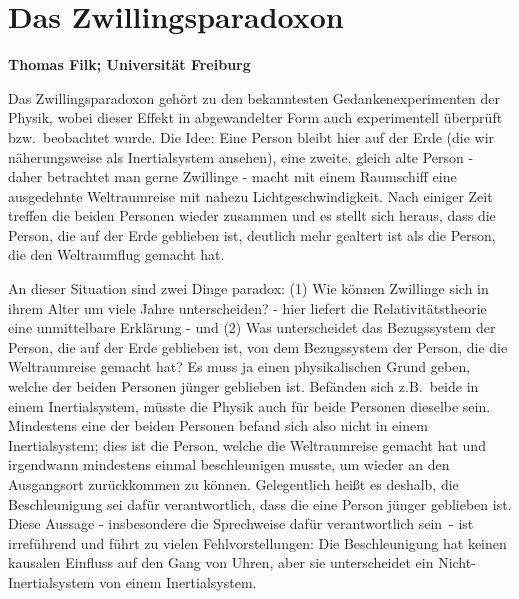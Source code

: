 
\setcounter{page}{1}
\setcounter{section}{0}
\setcounter{figure}{0}
\setcounter{equation}{0}
\setcounter{table}{0}
\setcounter{footnote}{0}

\section*{Das Zwillingsparadoxon}
\noindent
{\bf Thomas Filk; Universit\"at Freiburg}
\vspace{1cm}

\label{chap_Zwilling}

\noindent
Das Zwillingsparadoxon geh\"ort zu den bekanntesten Gedankenexperimenten der Physik,
wobei dieser Effekt in abgewandelter Form auch
experimentell \"uberpr\"uft bzw.\ beobachtet wurde. 
Die Idee: Eine Person bleibt hier auf der Erde (die wir n\"aherungsweise als Inertialsystem
ansehen), eine zweite, gleich alte Person - daher betrachtet man gerne Zwillinge - macht
mit einem Raumschiff eine ausgedehnte Weltraumreise mit nahezu Lichtgeschwindigkeit.
Nach einiger Zeit treffen die beiden Personen wieder zusammen und es stellt sich heraus,
dass die Person, die auf der Erde geblieben ist, deutlich mehr gealtert ist als die Person, die den
Weltraumflug gemacht hat. 

An dieser Situation sind zwei Dinge paradox: (1) Wie k\"onnen Zwillinge sich in ihrem
Alter um viele Jahre unterscheiden? - hier liefert die Relativit\"atstheorie eine unmittelbare
Erkl\"arung - und (2) Was unterscheidet das Bezugssystem der Person, die auf der Erde
geblieben ist, von dem Bezugssystem der Person, die die Weltraumreise gemacht hat?
Es muss ja einen physikalischen Grund geben, welche der beiden Personen j\"unger
geblieben ist. Bef\"anden sich z.B.\ beide in einem Inertial\-sys\-tem, m\"usste die Physik auch f\"ur
beide Personen dieselbe sein. Mindestens eine der beiden Personen befand sich also nicht in einem 
Inertialsystem; dies ist die Person, welche die Weltraumreise gemacht hat und irgendwann
mindestens einmal beschleunigen musste, um wieder an den Ausgangsort zur\"uckkommen zu k\"onnen. 
Gelegentlich hei\ss t es deshalb, die Beschleunigung sei daf\"ur verantwortlich, dass die
eine Person j\"unger geblieben ist. Diese Aussage - insbesondere die Sprechweise
\glqq daf\"ur verantwortlich sein\grqq\ - ist irref\"uhrend und f\"uhrt zu vielen
Fehlvorstellungen: Die Beschleunigung hat keinen kausalen Einfluss auf den Gang von
Uhren, aber sie unterscheidet ein Nicht-Inertialsystem von einem Inertialsystem.  

